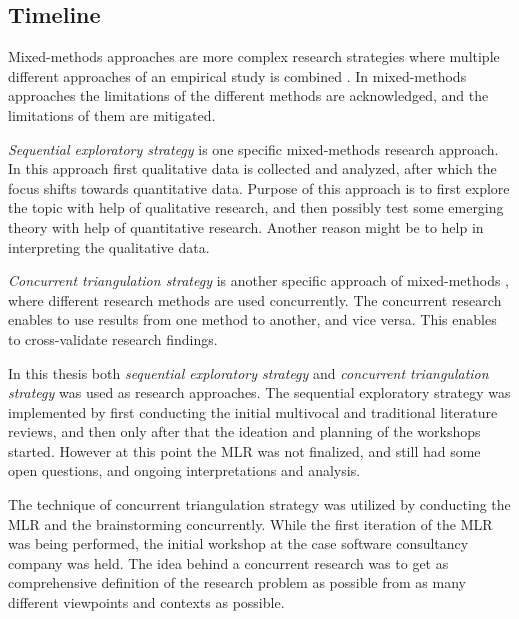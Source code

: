 \documentclass[english, 12pt, a4paper, sci, utf8, a-1b, online]{aaltothesis}
\begin{document}


\subsection{Timeline}

Mixed-methods approaches are more complex research strategies where multiple different approaches of an empirical study is combined \parencite{easterbrook2008selecting}. In mixed-methods approaches the limitations of the different methods are acknowledged, and the limitations of them are mitigated.

\textit{Sequential exploratory strategy} is one specific mixed-methods research approach. In this approach first qualitative data is collected and analyzed, after which the focus shifts towards quantitative data. Purpose of this approach is to first explore the topic with help of qualitative research, and then possibly test some emerging theory with help of quantitative research. Another reason might be to help in interpreting the qualitative data.

\textit{Concurrent triangulation strategy} is another specific approach of mixed-methods \parencite{easterbrook2008selecting}, where different research methods are used concurrently. The concurrent research enables to use results from one method to another, and vice versa. This enables to cross-validate research findings.

In this thesis both \textit{sequential exploratory strategy} and \textit{concurrent triangulation strategy} was used as research approaches. The sequential exploratory strategy was implemented by first conducting the initial multivocal and traditional literature reviews, and then only after that the ideation and planning of the workshops started. However at this point the MLR was not finalized, and still had some open questions, and ongoing interpretations and analysis.

The technique of concurrent triangulation strategy was utilized by conducting the MLR and the brainstorming concurrently. While the first iteration of the MLR was being performed, the initial workshop at the case software consultancy company was held. The idea behind a concurrent research was to get as comprehensive definition of the research problem as possible from as many different viewpoints and contexts as possible.
\end{document}
